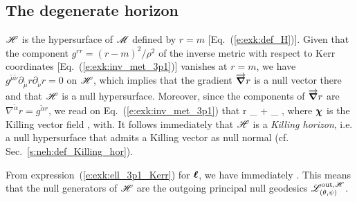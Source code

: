 \subsection{The degenerate horizon} \label{s:exk:horizon}

$\mathscr{H}$ is the hypersurface of $\mathscr{M}$ defined by $r=m$ [Eq.~(\ref{e:exk:def_H})]. Given
that the component $g^{rr} = (r - m)^2/\rho^2$ of the inverse metric with respect to Kerr coordinates
[Eq.~(\ref{e:exk:inv_met_3p1})] vanishes at $r=m$, we have
$g^{\tilde{\mu}\tilde{\nu}} \partial_{\tilde{\mu}} r \partial_{\tilde{\nu}} r = 0$ on $\mathscr{H}$,
which implies that the gradient $\overrightarrow{\bm{\nabla}} r$
is a null vector there and that $\mathscr{H}$ is a null hypersurface.
Moreover, since the components of $\overrightarrow{\bm{\nabla}} r$ are $\nabla^{\tilde{\alpha}} r = g^{\tilde{\alpha}r}$,
we read on Eq.~(\ref{e:exk:inv_met_3p1}) that
\be
    \vw{\nabla} r \equalH {} \wpar_{\ti} +  \wpar_{\tph}
        \equalH {} \w{\chi} ,
\ee
where $\bm{\chi}$ is the Killing vector field
\be \label{e:exk:def_chi}
    ,
    \qquad\mbox{with}\quad {}.
\ee
It follows immediately that $\mathscr{H}$ is a \emph{Killing horizon}, i.e. a null hypersurface
that admits a Killing vector as null normal (cf. Sec.~\ref{s:neh:def_Killing_hor}).

From expression~(\ref{e:exk:ell_3p1_Kerr}) for $\bm{\ell}$, we have immediately
\be \label{e:exk:ell_chi_on_H}
    \wl \equalH \w{\chi} .
\ee
This means that the null generators of $\mathscr{H}$ are the outgoing principal null
geodesics $\mathscr{L}^{{\rm out},\mathscr{H}}_{(\theta,\psi)}$.

